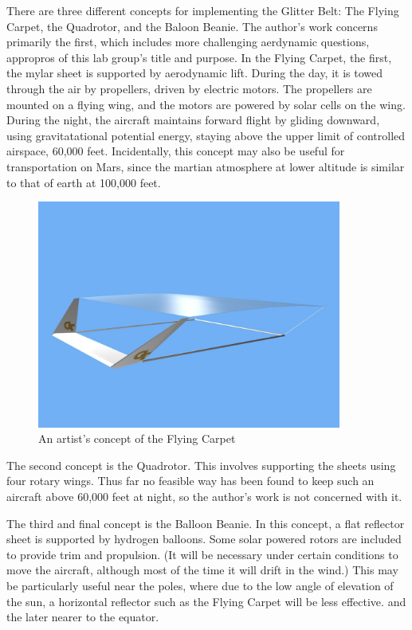 \documentclass[12pt]{report} %
\begin{document}
There are three different concepts for implementing the Glitter Belt: The Flying Carpet, the Quadrotor, and the Baloon Beanie.  The
author's work concerns primarily the first, which includes more challenging aerdynamic questions,
appropros of this lab group's title and purpose.  In the Flying Carpet,
the first, the mylar sheet is supported by aerodynamic lift.  During the day, it is towed through the air by propellers, driven
by electric motors.  The propellers are mounted on a flying wing, and the motors are powered by solar cells on the wing.  During the
night, the aircraft maintains forward flight by gliding downward, using gravitatational potential energy, staying above the upper limit
of controlled airspace, 60,000 feet.  Incidentally, this concept may also be useful for transportation on Mars, since the martian atmosphere
at lower altitude is similar to that of earth at 100,000 feet.
\begin{figure}
\includegraphics[width = 10cm]{FlyingCarpet.jpg}
\caption{An artist's concept of the Flying Carpet}
\end{figure}

The second concept is the Quadrotor.  This involves supporting the sheets using four rotary wings.  Thus far no feasible way has been
found to keep such an aircraft above 60,000 feet at night, so the author's work is not concerned with it.

The third and final concept is the Balloon Beanie.  In this concept, a flat reflector sheet is supported by hydrogen balloons.  Some
solar powered rotors are included to provide trim and propulsion. (It will be necessary under certain conditions to move the aircraft,
although most of the time it will drift in the wind.)  This may be particularly useful near the poles, where due to the low angle of
elevation of the sun, a horizontal reflector such as the Flying Carpet will be less effective.
and the later nearer to the equator.
\end{document}
